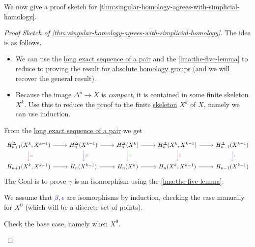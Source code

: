 We now give a proof sketch for \autoref{thm:singular-homology-agrees-with-simplicial-homology}.
\begin{proof}[Proof Sketch of \autoref{thm:singular-homology-agrees-with-simplicial-homology}]
	The idea is as follows.
	\begin{itemize}
		\item We can use the \hyperref[thm:long-exact-sequence-of-a-pair]{long exact sequence of a pair} and the \autoref{lma:the-five-lemma} to reduce to proving the result for \hyperref[def:homology-group]{absolute homology groups} (and we will recover the general result).
		\item Because the image \(\Delta^n \to X\) is \emph{compact}, it is contained in some finite \hyperref[def:skeleton]{skeleton} \(X^k\). Use this to reduce the proof to the finite \hyperref[def:skeleton]{skeleton} \(X^k\) of \(X\), namely we can use induction.
	\end{itemize}
	From the \hyperref[thm:long-exact-sequence-of-a-pair]{long exact sequence of a pair} we get
	\[
		\begin{tikzcd}
			{H^\Delta_{n+1}(X^k, X^{k-1})} & {H^\Delta_{n}(X^{k-1})} & {H^\Delta_{n}(X^{k})} & {H^\Delta_{n}(X^k, X^{k-1})} & {H^\Delta_{n-1}(X^{k-1})} \\
			{H_{n+1}(X^k, X^{k-1})} & {H_{n}(X^{k-1})} & {H_{n}(X^{k})} & {H_{n}(X^k, X^{k-1})} & {H_{n-1}(X^{k-1})}
			\arrow["\alpha", color={rgb,255:red,214;green,92;blue,92}, from=1-1, to=2-1]
			\arrow["\beta", color={rgb,255:red,92;green,92;blue,214}, from=1-2, to=2-2]
			\arrow["\gamma", color={rgb,255:red,124;green,194;blue,112}, from=1-3, to=2-3]
			\arrow["\delta", color={rgb,255:red,214;green,92;blue,92}, from=1-4, to=2-4]
			\arrow["\epsilon", color={rgb,255:red,92;green,92;blue,214}, from=1-5, to=2-5]
			\arrow[from=1-1, to=1-2]
			\arrow[from=1-2, to=1-3]
			\arrow[from=1-3, to=1-4]
			\arrow[from=1-4, to=1-5]
			\arrow[from=2-1, to=2-2]
			\arrow[from=2-2, to=2-3]
			\arrow[from=2-3, to=2-4]
			\arrow[from=2-4, to=2-5]
		\end{tikzcd}
	\]
	The Goal is to prove \(\gamma\) is an isomorphism using the \autoref{lma:the-five-lemma}.

	We assume that \textcolor{blue}{\(\beta, \epsilon \)} are isomorphisms by induction, checking the case manually for \(X^0\) (which will be a discrete set of points).

	\begin{exercise}
		Check the base case, namely when \(X^0\).
	\end{exercise}


\end{proof}
